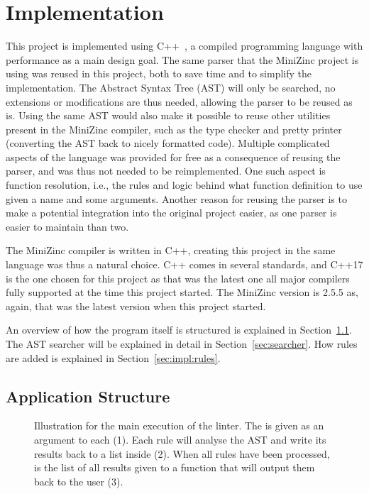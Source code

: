 \documentclass[a4paper,12pt]{article}
\begin{document}
\section{Implementation}\label{sec:impl}
This project is implemented using C++~\cite{cpp}, a compiled programming language with
performance as a main design goal. The same parser that the MiniZinc project is
using was reused in this project, both to save time and to simplify the implementation.
The Abstract Syntax Tree (AST) will only be searched, no extensions or
modifications are thus needed, allowing the parser to be reused as is.
Using the same AST would also make it possible to reuse other utilities
present in the MiniZinc compiler, such as the type checker and pretty printer (converting
the AST back to nicely formatted code). Multiple complicated aspects of the language was
provided for free as a consequence of reusing the parser, and was thus not needed to be
reimplemented. One such aspect is function
resolution, i.e., the rules and logic behind what function definition to use given a name
and some arguments. Another reason
for reusing the parser is to make a potential integration into the original project easier,
as one parser is easier to maintain than two.

The MiniZinc
compiler is written in C++, creating this project in the
same language was thus a natural choice. C++ comes in several standards, and C++17 is the one
chosen for this project as that was the latest one all major compilers fully supported at
the time this project started. The MiniZinc version is 2.5.5 as, again, that was the
latest version when this project started.

An overview of how the program itself is structured is explained in
Section~\ref{sec:impl:structure}. The AST searcher will be explained in detail in
Section~\ref{sec:searcher}. How rules are added is explained in Section~\ref{sec:impl:rules}.

\subsection{Application Structure}\label{sec:impl:structure}
\begin{figure}[ht]
  \centering
  \smallskip%
  
  \smallskip%
  \caption{Illustration for the main execution of the linter. The  is given as
    an argument to each  (1). Each rule will analyse the AST and write its
    results back to a list inside  (2). When all rules have been processed, is
    the list of all results given to a function that will output them back to the user
    (3).}%
  \label{fig:overview}
\end{figure}
\end{document}
